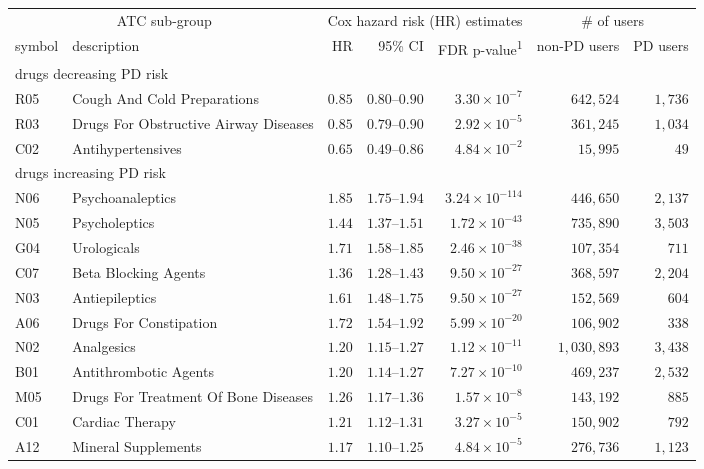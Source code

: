 \setlength{\LTpost}{0mm}
\begin{longtable}{llrrrrr}
\toprule
\multicolumn{2}{c}{ATC sub-group} & \multicolumn{3}{c}{Cox hazard risk (HR) estimates} & \multicolumn{2}{c}{\# of users} \\ 
\cmidrule(lr){1-2} \cmidrule(lr){3-5} \cmidrule(lr){6-7}
symbol & description & HR & 95\% CI & FDR p-value\textsuperscript{1} & non-PD users & PD users \\ 
\midrule
\multicolumn{7}{l}{drugs decreasing PD risk} \\ 
\midrule
R05 & Cough And Cold Preparations & $0.85$ & $0.80$–$0.90$ & $3.30 \times 10^{-7}$ & $642,524$ & $1,736$ \\ 
R03 & Drugs For Obstructive Airway Diseases & $0.85$ & $0.79$–$0.90$ & $2.92 \times 10^{-5}$ & $361,245$ & $1,034$ \\ 
C02 & Antihypertensives & $0.65$ & $0.49$–$0.86$ & $4.84 \times 10^{-2}$ & $15,995$ & $49$ \\ 
\midrule
\multicolumn{7}{l}{drugs increasing PD risk} \\ 
\midrule
N06 & Psychoanaleptics & $1.85$ & $1.75$–$1.94$ & $3.24 \times 10^{-114}$ & $446,650$ & $2,137$ \\ 
N05 & Psycholeptics & $1.44$ & $1.37$–$1.51$ & $1.72 \times 10^{-43}$ & $735,890$ & $3,503$ \\ 
G04 & Urologicals & $1.71$ & $1.58$–$1.85$ & $2.46 \times 10^{-38}$ & $107,354$ & $711$ \\ 
C07 & Beta Blocking Agents & $1.36$ & $1.28$–$1.43$ & $9.50 \times 10^{-27}$ & $368,597$ & $2,204$ \\ 
N03 & Antiepileptics & $1.61$ & $1.48$–$1.75$ & $9.50 \times 10^{-27}$ & $152,569$ & $604$ \\ 
A06 & Drugs For Constipation & $1.72$ & $1.54$–$1.92$ & $5.99 \times 10^{-20}$ & $106,902$ & $338$ \\ 
N02 & Analgesics & $1.20$ & $1.15$–$1.27$ & $1.12 \times 10^{-11}$ & $1,030,893$ & $3,438$ \\ 
B01 & Antithrombotic Agents & $1.20$ & $1.14$–$1.27$ & $7.27 \times 10^{-10}$ & $469,237$ & $2,532$ \\ 
M05 & Drugs For Treatment Of Bone Diseases & $1.26$ & $1.17$–$1.36$ & $1.57 \times 10^{-8}$ & $143,192$ & $885$ \\ 
C01 & Cardiac Therapy & $1.21$ & $1.12$–$1.31$ & $3.27 \times 10^{-5}$ & $150,902$ & $792$ \\ 
A12 & Mineral Supplements & $1.17$ & $1.10$–$1.25$ & $4.84 \times 10^{-5}$ & $276,736$ & $1,123$ \\ 

\end{longtable}

